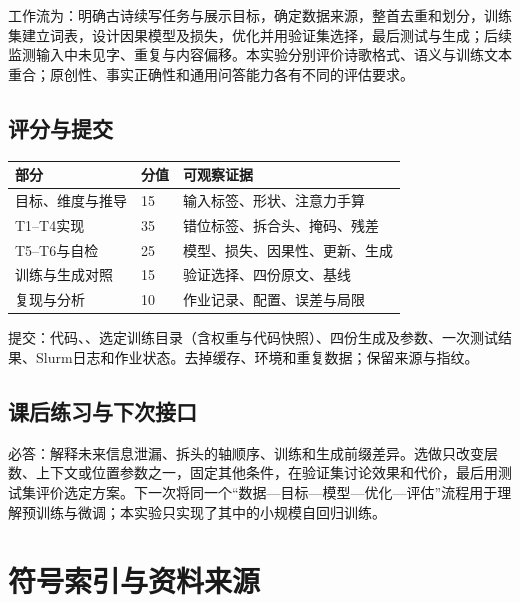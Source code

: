 \documentclass[UTF8,a4paper,11pt,fontset=fandol]{ctexart}
\newcommand{\file}[1]{\allowbreak\texttt{\detokenize{#1}}}
\begin{document}
工作流为：明确古诗续写任务与展示目标，确定数据来源，整首去重和划分，训练集建立词表，设计因果模型及损失，优化并用验证集选择，最后测试与生成；后续监测输入中未见字、重复与内容偏移。本实验分别评价诗歌格式、语义与训练文本重合；原创性、事实正确性和通用问答能力各有不同的评估要求。
\subsection{评分与提交}
\par\noindent\begin{tabularx}{\linewidth}{L{4cm}L{1.5cm}Y}\toprule
部分 & 分值 & 可观察证据\\\midrule
目标、维度与推导 & 15 & 输入标签、形状、注意力手算\\
T1--T4实现 & 35 & 错位标签、拆合头、掩码、残差\\
T5--T6与自检 & 25 & 模型、损失、因果性、更新、生成\\
训练与生成对照 & 15 & 验证选择、四份原文、基线\\
复现与分析 & 10 & 作业记录、配置、误差与局限\\\bottomrule
\end{tabularx}\par
提交\texttt{}：代码、\file{report.pdf}、选定训练目录（含权重与代码快照）、四份生成及参数、一次测试结果、Slurm日志和作业状态。去掉缓存、环境和重复数据；保留来源与指纹。
\subsection{课后练习与下次接口}
必答：解释未来信息泄漏、拆头的轴顺序、训练和生成前缀差异。选做只改变层数、上下文或位置参数之一，固定其他条件，在验证集讨论效果和代价，最后用测试集评价选定方案。下一次将同一个“数据—目标—模型—优化—评估”流程用于理解预训练与微调；本实验只实现了其中的小规模自回归训练。

\clearpage
\section{符号索引与资料来源}
\end{document}
